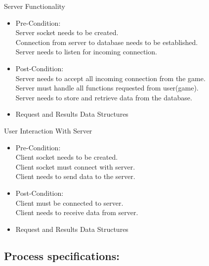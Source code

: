 \documentclass[letterpaper]{article}
\begin{document}
				\vspace{0.1in}
					\hspace{5mm}Server Functionality
					\begin{itemize}
						\item Pre-Condition: \\
							Server socket needs to be created. \\
							Connection from server to database needs to be established. \\
							Server needs to listen for incoming connection.
						\item Post-Condition: \\
							Server needs to accept all incoming connection from the game. \\
							Server must handle all functions requested from user(game).\\
							Server needs to store and retrieve data from the database.			
						\item Request and Results Data Structures \\
						
					\end{itemize}
					
					\vspace{0.1in}
					User Interaction With Server
					\begin{itemize}
						\item Pre-Condition: \\
							Client socket needs to be created. \\
							Client socket must connect with server. \\
							Client needs to send data to the server. 
						\item Post-Condition: \\
							Client must be connected to server. \\
							Client needs to receive data from server.			
						\item Request and Results Data Structures \\
						
					\end{itemize}
					
			\vspace{0.2in}
			\subsection*{Process specifications:}
			\vspace{0.1in}
			
\end{document}
